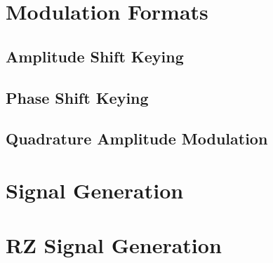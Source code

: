 \section{Modulation Formats}
\subsection{Amplitude Shift Keying}
 
\subsection{Phase Shift Keying}

\subsection{Quadrature Amplitude Modulation}


\section{Signal Generation}

\section{RZ Signal Generation}